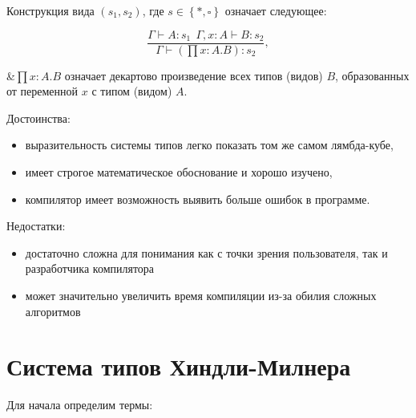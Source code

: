 Конструкция вида $(s_1, s_2)$, где $s \in \left\{ *, \square \right\}$ означает следующее:

\begin{equation}
    \label{eq:type_system_rules}
    \frac{
        \Gamma \vdash A: s_1 ~~ \Gamma, x: A \vdash B: s_2
    }{
        \Gamma \vdash (\prod x: A. B): s_2
    },
\end{equation}
\begin{eqrem}
    &$\prod x: A. B$ означает декартово произведение всех типов (видов) $B$, образованных от переменной $x$ с типом (видом) $A$.
\end{eqrem}

Достоинства:
\begin{itemize}
    \item выразительность системы типов легко показать том же самом лямбда-кубе,
    \item имеет строгое математическое обоснование и хорошо изучено,
    \item компилятор имеет возможность выявить больше ошибок в программе.
\end{itemize}

Недостатки:
\begin{itemize}
    \item достаточно сложна для понимания как с точки зрения пользователя, так и разработчика компилятора
    \item может значительно увеличить время компиляции из-за обилия сложных алгоритмов
\end{itemize}



\section{Система типов Хиндли-Милнера}
\label{sec:hindley-milner}


Для начала определим термы:

